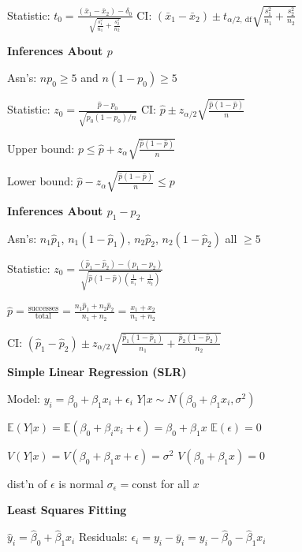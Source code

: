 \documentclass[twocolumn]{article}
\begin{document}
Statistic: $t_0 = \frac{(\bar{x}_1 - \bar{x}_2) - \delta_0}{\sqrt{ \frac{s_1^2}{n_1} + \frac{s_2^2}{n_2} }}$ \hfill CI: $(\bar{x}_1 - \bar{x}_2) \pm t_{\alpha/2,\ \text{df}} \sqrt{ \frac{s_1^2}{n_1} + \frac{s_2^2}{n_2} }$

\dotfill


\textbf{Inferences About $p$}

Asn's: $np_0 \geq 5$ and $n(1-p_0) \geq 5$

Statistic: $z_0 = \frac{\hat{p} - p_0}{\sqrt{p_0 (1-p_0)/n}}$ \hfill CI: $\hat{p} \pm z_{\alpha/2} \sqrt{\frac{\hat{p}(1-\hat{p})}{n}}$

Upper bound: $p \leq \hat{p} + z_\alpha \sqrt{ \frac{\hat{p}(1-\hat{p})}{n} }$

Lower bound: $\hat{p} - z_\alpha \sqrt{ \frac{\hat{p}(1-\hat{p})}{n} } \leq p$


\newpage


\textbf{Inferences About $p_1 - p_2$}

Asn's: $n_1 \hat{p}_1$, $n_1(1 - \hat{p}_1)$, $n_2\hat{p}_2$, $n_2 (1-\hat{p}_2)$ all $\geq 5$

Statistic: $z_0 = \frac{(\hat{p}_1 - \hat{p}_2) - (p_1 - p_2)}{\sqrt{ \hat{p}(1-\hat{p}) \left( \frac{1}{n_1} + \frac{1}{n_2} \right) }}$

$\hat{p} = \frac{\text{successes}}{\text{total}} = \frac{n_1 \hat{p}_1 + n_2 \hat{p}_2}{n_1 + n_2} = \frac{x_1 + x_2}{n_1 + n_2}$

CI: $(\hat{p}_1 - \hat{p}_2) \pm z_{\alpha/2} \sqrt{ \frac{\hat{p}_1 (1-\hat{p}_1)}{n_1}  + \frac{\hat{p}_2 (1 - \hat{p}_2)}{n_2} }$

\dotfill

\textbf{Simple Linear Regression (SLR)}

Model: $y_i = \beta_0 + \beta_1 x_i + \epsilon_i$ \hfill $Y | x \sim N(\beta_0 + \beta_1 x_i, \sigma^2)$

$\mathbb{E}(Y | x) = \mathbb{E}(\beta_0 + \beta_i x_i + \epsilon) = \beta_0 + \beta_1 x$ \hfill $\mathbb{E}(\epsilon) = 0$

$V(Y | x) = V(\beta_0 + \beta_1 x + \epsilon) = \sigma^2$ \hfill $V(\beta_0 + \beta_1 x) = 0$

dist'n of $\epsilon$ is normal \hfill $\sigma_\epsilon = \text{const}$ for all $x$

\vspace{-.5em}
\dotfill

\textbf{Least Squares Fitting}

$\hat{y}_i = \hat{\beta}_0 + \hat{\beta}_1 x_i$ \hfill Residuals: $\epsilon_i = y_i - \bar{y}_i = y_i - \hat{\beta}_0 - \hat{\beta}_1 x_i$
\end{document}

